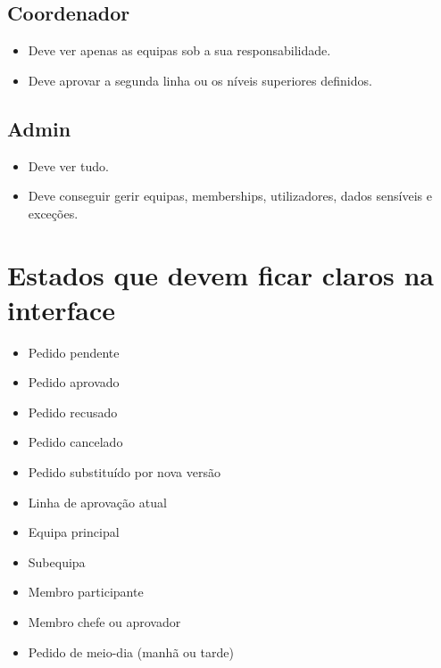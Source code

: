 \documentclass[11pt,a4paper]{article}
\begin{document}
\subsection{Coordenador}
\begin{itemize}
  \item Deve ver apenas as equipas sob a sua responsabilidade.
  \item Deve aprovar a segunda linha ou os níveis superiores definidos.
\end{itemize}

\subsection{Admin}
\begin{itemize}
  \item Deve ver tudo.
  \item Deve conseguir gerir equipas, memberships, utilizadores, dados sensíveis e exceções.
\end{itemize}

\section{Estados que devem ficar claros na interface}
\begin{itemize}
  \item Pedido pendente
  \item Pedido aprovado
  \item Pedido recusado
  \item Pedido cancelado
  \item Pedido substituído por nova versão
  \item Linha de aprovação atual
  \item Equipa principal
  \item Subequipa
  \item Membro participante
  \item Membro chefe ou aprovador
  \item Pedido de meio-dia (manhã ou tarde)
\end{itemize}
\end{document}

